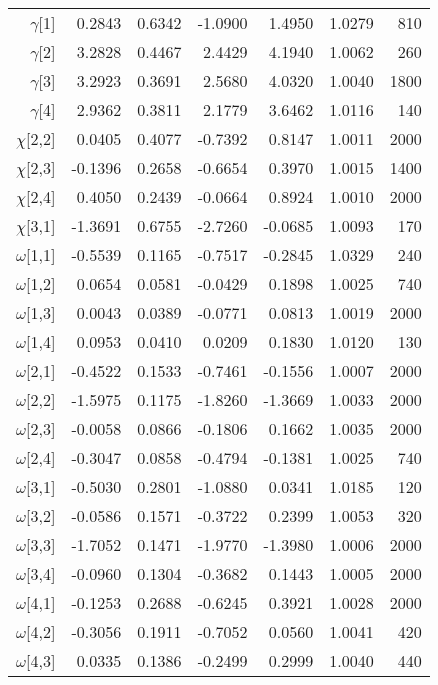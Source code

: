 \documentclass[11pt]{article}
\begin{document}
\begin{table}[ht]
\begin{tabular}{rrrrrrr}
   \hline
    $\gamma$[1] & 0.2843 & 0.6342 & -1.0900 & 1.4950 & 1.0279 &   810 \\ 
    $\gamma$[2] & 3.2828 & 0.4467 & 2.4429 & 4.1940 & 1.0062 &   260 \\ 
    $\gamma$[3] & 3.2923 & 0.3691 & 2.5680 & 4.0320 & 1.0040 &  1800 \\ 
    $\gamma$[4] & 2.9362 & 0.3811 & 2.1779 & 3.6462 & 1.0116 &   140 \\ 
    $\chi$[2,2] & 0.0405 & 0.4077 & -0.7392 & 0.8147 & 1.0011 &  2000 \\ 
    $\chi$[2,3] & -0.1396 & 0.2658 & -0.6654 & 0.3970 & 1.0015 &  1400 \\ 
    $\chi$[2,4] & 0.4050 & 0.2439 & -0.0664 & 0.8924 & 1.0010 &  2000 \\ 
    $\chi$[3,1] & -1.3691 & 0.6755 & -2.7260 & -0.0685 & 1.0093 &   170 \\ 
      $\omega$[1,1] & -0.5539 & 0.1165 & -0.7517 & -0.2845 & 1.0329 &   240 \\ 
      $\omega$[1,2] & 0.0654 & 0.0581 & -0.0429 & 0.1898 & 1.0025 &   740 \\ 
      $\omega$[1,3] & 0.0043 & 0.0389 & -0.0771 & 0.0813 & 1.0019 &  2000 \\ 
      $\omega$[1,4] & 0.0953 & 0.0410 & 0.0209 & 0.1830 & 1.0120 &   130 \\ 
      $\omega$[2,1] & -0.4522 & 0.1533 & -0.7461 & -0.1556 & 1.0007 &  2000 \\ 
      $\omega$[2,2] & -1.5975 & 0.1175 & -1.8260 & -1.3669 & 1.0033 &  2000 \\ 
      $\omega$[2,3] & -0.0058 & 0.0866 & -0.1806 & 0.1662 & 1.0035 &  2000 \\ 
      $\omega$[2,4] & -0.3047 & 0.0858 & -0.4794 & -0.1381 & 1.0025 &   740 \\ 
      $\omega$[3,1] & -0.5030 & 0.2801 & -1.0880 & 0.0341 & 1.0185 &   120 \\ 
      $\omega$[3,2] & -0.0586 & 0.1571 & -0.3722 & 0.2399 & 1.0053 &   320 \\ 
      $\omega$[3,3] & -1.7052 & 0.1471 & -1.9770 & -1.3980 & 1.0006 &  2000 \\ 
      $\omega$[3,4] & -0.0960 & 0.1304 & -0.3682 & 0.1443 & 1.0005 &  2000 \\ 
      $\omega$[4,1] & -0.1253 & 0.2688 & -0.6245 & 0.3921 & 1.0028 &  2000 \\ 
      $\omega$[4,2] & -0.3056 & 0.1911 & -0.7052 & 0.0560 & 1.0041 &   420 \\ 
      $\omega$[4,3] & 0.0335 & 0.1386 & -0.2499 & 0.2999 & 1.0040 &   440 \\ 

\end{tabular}
\end{table}
\end{document}
